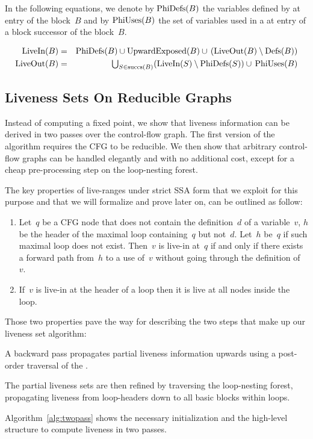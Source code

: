 In the following equations, we denote by $\textrm{PhiDefs}(B)$ the variables defined by \phifuns at entry of the block~$B$ and by $\textrm{PhiUses}(B)$ the set of variables used in a \phifun at entry of a block successor of the block~$B$.

\begin{eqnarray*}
	\textrm{LiveIn}(B) & = & \textrm{PhiDefs}(B) \cup \textrm{UpwardExposed}(B) \cup \,(\textrm{LiveOut}(B)\setminus \textrm{Defs}(B)) \\
	\textrm{LiveOut}(B)& = &
	\textstyle \bigcup_{S \in \textrm{succs}(B)} (\textrm{LiveIn}(S) \setminus
	\textrm{PhiDefs}(S)) \cup\, \textrm{PhiUses}(B)
\end{eqnarray*}

\subsection{Liveness Sets On Reducible Graphs}
\label{sec:forreducible}

Instead of computing a fixed point, we show that liveness information can be derived in two passes over the control-flow graph.
The first version of the algorithm requires the CFG to be reducible.
We then show that arbitrary control-flow graphs can be handled elegantly and with no additional cost, except for a cheap pre-processing step on the loop-nesting forest.

The key properties of live-ranges under strict SSA form that we exploit for this purpose and that we will formalize and prove later on, can be outlined as follow:
\begin{enumerate}
\item
	Let~$q$ be a CFG node that does not contain the definition~$d$ of a variable~$v$, $h$ be the header of the maximal loop containing~$q$ but not~$d$.
	Let~$h$ be~$q$ if such maximal loop does not exist.
	Then~$v$ is live-in at~$q$ if and only if there exists a forward path from~$h$ to a use of~$v$ without going through the definition of~$v$.
\item
	If~$v$ is live-in at the header of a loop then it is live at all nodes inside the loop.
\end{enumerate}
Those two properties pave the way for describing the two steps that make up our liveness set algorithm:
\begin{compactenum}
\item
	A backward pass propagates partial liveness information upwards using a post-order traversal of the \@CFG.
\item
	The partial liveness sets are then refined by traversing the loop-nesting forest, propagating liveness from loop-headers down to all basic blocks within loops.
\end{compactenum}
Algorithm~\ref{alg:twopass} shows the necessary initialization and the high-level structure to compute liveness in two passes.

